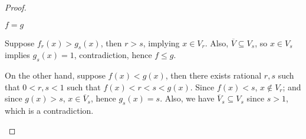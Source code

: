 \begin{proof}
	\begin{claim}
		\(f = g\)
	\end{claim}
	\begin{explanation}
		Suppose \(f_r(x) > g_s(x)\), then \(r > s\), implying \(x\in V_r\). Also, \(\overline{V} \subseteq V_s\), so \(x\in V_s\) implies \(g_s(x) = 1\), contradiction, hence \(f \leq g\).

		On the other hand, suppose \(f(x) < g(x)\), then there exists rational \(r, s\) such that \(0 < r, s < 1\) such that \(f(x) < r < s < g(x)\). Since \(f(x) < s\), \(x \notin V_r\); and since \(g(x) > s\), \(x \in \overline{V} _s\), hence \(g_s(x) = s\). Also, we have \(\overline{V} _s \subseteq V_s\) since \(s > 1\), which is a contradiction.
	\end{explanation}
\end{proof}
